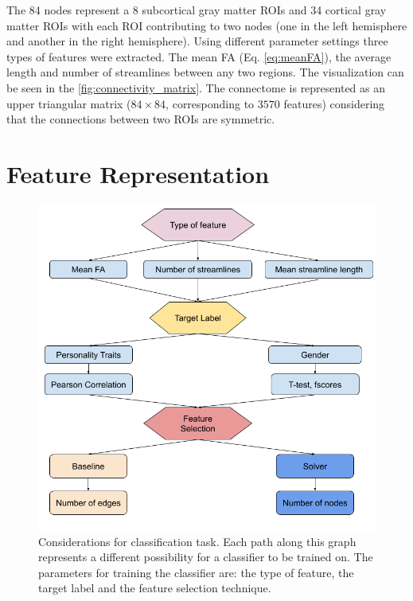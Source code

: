 \documentclass[msthesis.tex]{subfiles}
\begin{document}
The 84 nodes represent a 8 subcortical gray matter ROIs and 34 cortical gray matter ROIs with each ROI contributing to two nodes (one in the left hemisphere and another in the right hemisphere). Using different parameter settings three types of features were extracted. The mean \gls{FA} (Eq. \ref{eq:meanFA}), the average length and number of streamlines between any two regions. The visualization can be seen in the \autoref{fig:connectivity_matrix}. The connectome is represented as an upper triangular matrix ($84 \times 84$, corresponding to $3570$ features) considering that the connections between two ROIs are symmetric.

\section{Feature Representation}
\begin{figure}
    \centering
    \includegraphics[width=\textwidth]{images/Graph_clf_possibilites.png}
    \caption{Considerations for classification task. Each path along this graph represents a different possibility for a classifier to be trained on. The parameters for training the classifier are: the type of feature, the target label and the feature selection technique.}
    \label{tab:classify_combo}
\end{figure}
\end{document}
